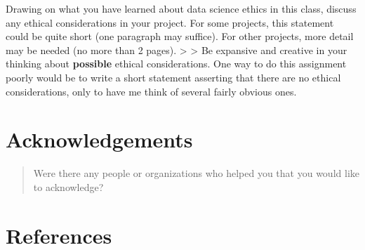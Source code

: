 \documentclass[
  letterpaper,
  DIV=11,
  numbers=noendperiod]{scrartcl}
\begin{document}
Drawing on what you have learned about data science ethics in this
class, discuss any ethical considerations in your project. For some
projects, this statement could be quite short (one paragraph may
suffice). For other projects, more detail may be needed (no more than 2
pages). \textgreater{} \textgreater{} Be expansive and creative in your
thinking about \textbf{possible} ethical considerations. One way to do
this assignment poorly would be to write a short statement asserting
that there are no ethical considerations, only to have me think of
several fairly obvious ones.

\section{Acknowledgements}\label{acknowledgements}

\begin{quote}
Were there any people or organizations who helped you that you would
like to acknowledge?
\end{quote}

\section*{References}\label{references}
\end{document}
